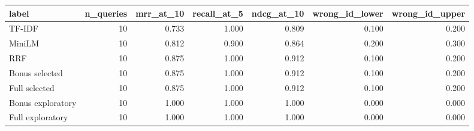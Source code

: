 \begin{tabular}{lrrrrrr}
\toprule
label & n\_queries & mrr\_at\_10 & recall\_at\_5 & ndcg\_at\_10 & wrong\_id\_lower & wrong\_id\_upper \\
\midrule
TF-IDF & 10 & 0.733 & 1.000 & 0.809 & 0.100 & 0.200 \\
MiniLM & 10 & 0.812 & 0.900 & 0.864 & 0.200 & 0.300 \\
RRF & 10 & 0.875 & 1.000 & 0.912 & 0.100 & 0.200 \\
Bonus selected & 10 & 0.875 & 1.000 & 0.912 & 0.100 & 0.200 \\
Full selected & 10 & 0.875 & 1.000 & 0.912 & 0.100 & 0.200 \\
Bonus exploratory & 10 & 1.000 & 1.000 & 1.000 & 0.000 & 0.000 \\
Full exploratory & 10 & 1.000 & 1.000 & 1.000 & 0.000 & 0.000 \\
\bottomrule
\end{tabular}
